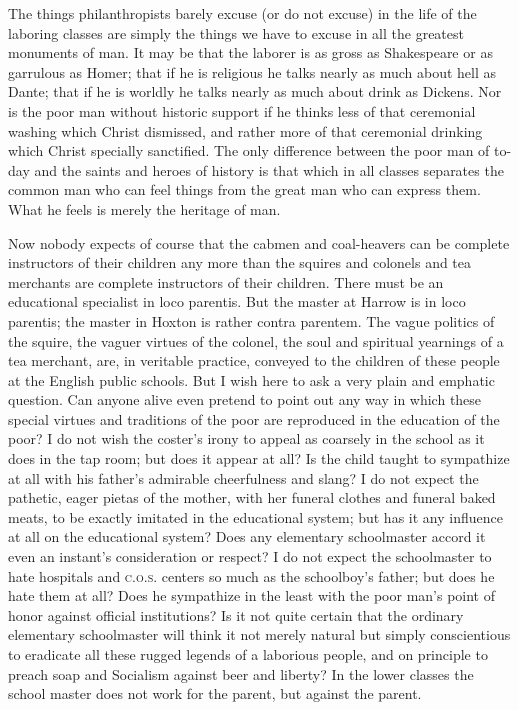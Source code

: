 \documentclass[final,10pt,letterpaper,twocolumn,openany]{book}
\begin{document}
The things philanthropists barely excuse (or do not excuse) in the life
of the laboring classes are simply the things we have to excuse in all the
greatest monuments of man. It may be that the laborer is as gross as
Shakespeare or as garrulous as Homer; that if he is religious he talks
nearly as much about hell as Dante; that if he is worldly he talks nearly as
much about drink as Dickens. Nor is the poor man without historic support
if he thinks less of that ceremonial washing which Christ dismissed, and
rather more of that ceremonial drinking which Christ specially sanctified.
The only difference between the poor man of to-day and the saints and
heroes of history is that which in all classes separates the common man
who can feel things from the great man who can express them. What he
feels is merely the heritage of man. 

Now nobody expects of course that the
cabmen and coal-heavers can be complete instructors of their children any
more than the squires and colonels and tea merchants are complete
instructors of their children. There must be an educational specialist in
loco parentis. But the master at Harrow is in loco parentis; the master in
Hoxton is rather contra parentem. The vague politics of the squire, the
vaguer virtues of the colonel, the soul and spiritual yearnings of a tea
merchant, are, in veritable practice, conveyed to the children of these
people at the English public schools. But I wish here to ask a very plain
and emphatic question. Can anyone alive even pretend to point out any
way in which these special virtues and traditions of the poor are
reproduced in the education of the poor? I do not wish the coster's irony to
appeal as coarsely in the school as it does in the tap room; but does it
appear at all? Is the child taught to sympathize at all with his father's
admirable cheerfulness and slang? I do not expect the pathetic, eager
pietas of the mother, with her funeral clothes and funeral baked meats, to
be exactly imitated in the educational system; but has it any influence at
all on the educational system? Does any elementary schoolmaster accord it
even an instant's consideration or respect? I do not expect the
schoolmaster to hate hospitals and \textsc{c.o.s.} centers so much as the
schoolboy's father; but does he hate them at all? Does he sympathize in the
least with the poor man's point of honor against official institutions? Is it
not quite certain that the ordinary elementary schoolmaster will think it
not merely natural but simply conscientious to eradicate all these rugged
legends of a laborious people, and on principle to preach soap and
Socialism against beer and liberty? In the lower classes the school master
does not work for the parent, but against the parent. 
\end{document}
